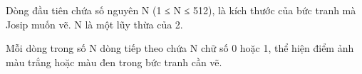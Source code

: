 Dòng đầu tiên chứa số nguyên N (1 ≤ N ≤ 512), là kích thước của bức tranh mà Josip muốn vẽ. N là một lũy thừa của 2.  

   Mỗi dòng trong số N dòng tiếp theo chứa N chữ số 0 hoặc 1, thể hiện điểm ảnh màu trắng hoặc màu đen trong bức tranh cần vẽ.  

\